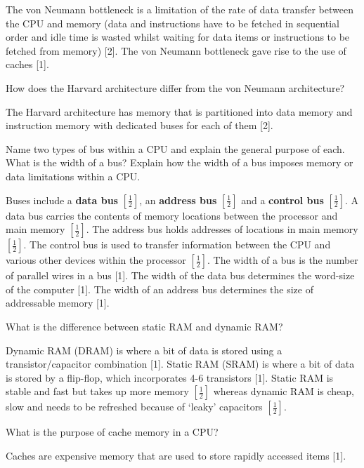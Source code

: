 \documentclass[addpoints]{exam}
\begin{document}
\begin{questions}
\begin{solution}[2in]
	The von Neumann bottleneck is a limitation of the rate of data transfer
	between the CPU and memory (data and instructions have to be
	fetched in sequential order and idle time is wasted whilst waiting for
	data items or instructions to be fetched from memory) [2]. The von
	Neumann bottleneck gave rise to the use of caches [1].
\end{solution}


\question[2]How does the Harvard architecture differ from the von Neumann architecture?
\begin{solution}[2in]
	The Harvard architecture has memory that is partitioned into data
	memory and instruction memory with dedicated buses for each of them
	[2].
\end{solution}

\question[6]Name two types of bus within a CPU and explain the general purpose
of each. What is the width of a bus? Explain how the width of a bus
imposes memory or data limitations within a CPU.
\begin{solution}[2in]
	Buses include a \textbf{data bus} $[\frac{1}{2}]$, an \textbf{address bus} $[\frac{1}{2}]$ and a \textbf{control bus} $[\frac{1}{2}]$. A data bus carries the contents of memory locations between the
	processor and main memory $[\frac{1}{2}]$. The address bus holds addresses of
	locations in main memory $[\frac{1}{2}]$. The control bus is used to transfer
	information between the CPU and various other devices within the
	processor $[\frac{1}{2}]$. The width of a bus is the number of parallel wires in
	a bus [1]. The width of the data bus determines the word-size of the
	computer [1]. The width of an address bus determines the size of
	addressable memory [1].
\end{solution}

\question[3]What is the difference between static RAM and dynamic RAM?
\begin{solution}[2in]
	Dynamic RAM (DRAM) is where a bit of data is stored using a transistor/capacitor
	combination [1]. Static RAM (SRAM) is where a bit
	of data is stored by a flip-flop, which incorporates 4-6 transistors [1].
	Static RAM is stable and fast but takes up more memory $[\frac{1}{2}]$ whereas
	dynamic RAM is cheap, slow and needs to be refreshed because of
	‘leaky’ capacitors $[\frac{1}{2}]$.
\end{solution}


\question[1]What is the purpose of cache memory in a CPU?
\begin{solution}[2in]
	Caches are expensive memory that are used to store rapidly accessed
	items [1].
\end{solution}


\end{questions}
\end{document}
